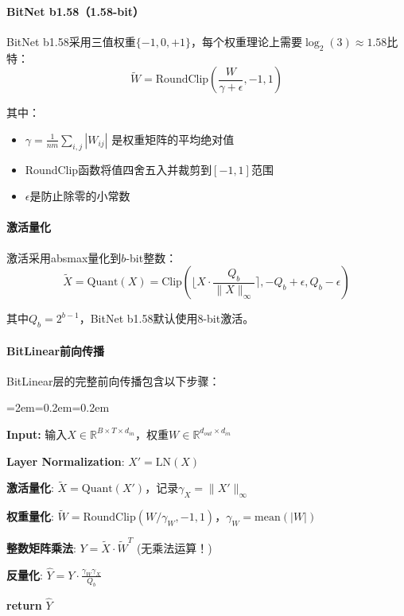 \documentclass[12pt,a4paper]{article}
\newenvironment{algorithmic}[1][]%
      {\begin{list}{}{\leftmargin=2em\itemsep=0.2em\parsep=0pt\topsep=0.2em}}%
      {\end{list}}
\newcommand{\STATE}{\item[]}
\newcommand{\REQUIRE}{\item[]\textbf{Input: }}
\newcommand{\RETURN}{\item[]\textbf{return} }
\begin{document}
\paragraph{BitNet b1.58（1.58-bit）}

BitNet b1.58采用三值权重$\{-1, 0, +1\}$，每个权重理论上需要$\log_2(3) \approx 1.58$比特：
\begin{equation}
\tilde{W} = \text{RoundClip}\left(\frac{W}{\gamma + \epsilon}, -1, 1\right)
\end{equation}

其中：
\begin{itemize}
    \item $\gamma = \frac{1}{nm}\sum_{i,j}|W_{ij}|$ 是权重矩阵的平均绝对值
    \item RoundClip函数将值四舍五入并裁剪到$[-1, 1]$范围
    \item $\epsilon$是防止除零的小常数
\end{itemize}

\paragraph{激活量化}

激活采用absmax量化到$b$-bit整数：
\begin{equation}
\tilde{X} = \text{Quant}(X) = \text{Clip}\left(\lfloor X \cdot \frac{Q_b}{\|X\|_\infty} \rceil, -Q_b + \epsilon, Q_b - \epsilon\right)
\end{equation}

其中$Q_b = 2^{b-1}$，BitNet b1.58默认使用8-bit激活。

\paragraph{BitLinear前向传播}

BitLinear层的完整前向传播包含以下步骤：

\begin{algorithm}[H]
\caption{BitLinear前向传播}
\begin{algorithmic}[1]
\REQUIRE 输入$X \in \mathbb{R}^{B \times T \times d_{in}}$，权重$W \in \mathbb{R}^{d_{out} \times d_{in}}$
\STATE \textbf{Layer Normalization}: $X' = \text{LN}(X)$
\STATE \textbf{激活量化}: $\tilde{X} = \text{Quant}(X')$，记录$\gamma_X = \|X'\|_\infty$
\STATE \textbf{权重量化}: $\tilde{W} = \text{RoundClip}(W/\gamma_W, -1, 1)$，$\gamma_W = \text{mean}(|W|)$
\STATE \textbf{整数矩阵乘法}: $Y = \tilde{X} \cdot \tilde{W}^T$ \quad (无乘法运算！)
\STATE \textbf{反量化}: $\hat{Y} = Y \cdot \frac{\gamma_W \gamma_X}{Q_b}$
\RETURN $\hat{Y}$
\end{algorithmic}
\end{algorithm}
\end{document}
